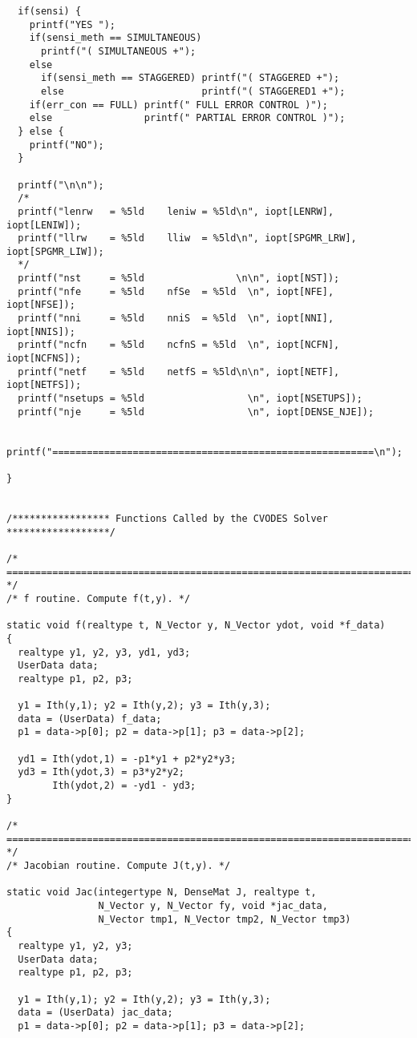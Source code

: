 \begin{verbatim}
  if(sensi) {
    printf("YES ");
    if(sensi_meth == SIMULTANEOUS)   
      printf("( SIMULTANEOUS +");
    else 
      if(sensi_meth == STAGGERED) printf("( STAGGERED +");
      else                        printf("( STAGGERED1 +");   
    if(err_con == FULL) printf(" FULL ERROR CONTROL )");
    else                printf(" PARTIAL ERROR CONTROL )");
  } else {
    printf("NO");
  }

  printf("\n\n");
  /*
  printf("lenrw   = %5ld    leniw = %5ld\n", iopt[LENRW], iopt[LENIW]);
  printf("llrw    = %5ld    lliw  = %5ld\n", iopt[SPGMR_LRW], iopt[SPGMR_LIW]);
  */
  printf("nst     = %5ld                \n\n", iopt[NST]);
  printf("nfe     = %5ld    nfSe  = %5ld  \n", iopt[NFE],  iopt[NFSE]);
  printf("nni     = %5ld    nniS  = %5ld  \n", iopt[NNI],  iopt[NNIS]);
  printf("ncfn    = %5ld    ncfnS = %5ld  \n", iopt[NCFN], iopt[NCFNS]);
  printf("netf    = %5ld    netfS = %5ld\n\n", iopt[NETF], iopt[NETFS]);
  printf("nsetups = %5ld                  \n", iopt[NSETUPS]);
  printf("nje     = %5ld                  \n", iopt[DENSE_NJE]);

  printf("========================================================\n");

}


/***************** Functions Called by the CVODES Solver ******************/

/* ======================================================================= */
/* f routine. Compute f(t,y). */

static void f(realtype t, N_Vector y, N_Vector ydot, void *f_data)
{
  realtype y1, y2, y3, yd1, yd3;
  UserData data;
  realtype p1, p2, p3;

  y1 = Ith(y,1); y2 = Ith(y,2); y3 = Ith(y,3);
  data = (UserData) f_data;
  p1 = data->p[0]; p2 = data->p[1]; p3 = data->p[2];

  yd1 = Ith(ydot,1) = -p1*y1 + p2*y2*y3;
  yd3 = Ith(ydot,3) = p3*y2*y2;
        Ith(ydot,2) = -yd1 - yd3;
}

/* ======================================================================= */
/* Jacobian routine. Compute J(t,y). */

static void Jac(integertype N, DenseMat J, realtype t,
                N_Vector y, N_Vector fy, void *jac_data, 
                N_Vector tmp1, N_Vector tmp2, N_Vector tmp3)
{
  realtype y1, y2, y3;
  UserData data;
  realtype p1, p2, p3;
 
  y1 = Ith(y,1); y2 = Ith(y,2); y3 = Ith(y,3);
  data = (UserData) jac_data;
  p1 = data->p[0]; p2 = data->p[1]; p3 = data->p[2];
 

\end{verbatim}
